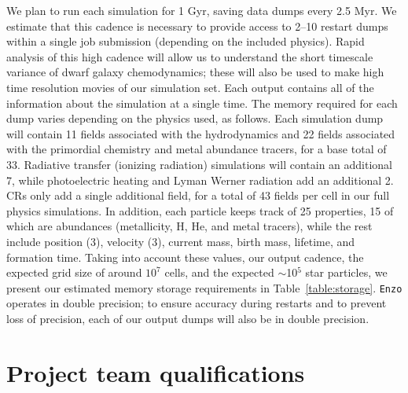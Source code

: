 \documentclass[11pt]{article}
\begin{document}
We plan to run each simulation for 1 Gyr, saving data dumps every 2.5 Myr. We estimate that this cadence is necessary to provide access to 2--10 restart dumps within a single job submission (depending on the included physics). Rapid analysis of this high cadence will allow us to understand the short timescale variance of dwarf galaxy chemodynamics; these will also be used to make high time resolution movies of our simulation set. Each output contains all of the information about the simulation at a single time. The memory required for each dump varies depending on the physics used, as follows. Each simulation dump will contain 11 fields associated with the hydrodynamics and 22 fields associated with the primordial chemistry and metal abundance tracers, for a base total of 33. Radiative transfer (ionizing radiation) simulations will contain an additional 7, while photoelectric heating and Lyman Werner radiation add an additional 2. CRs only add a single additional field, for a total of 43 fields per cell in our full physics simulations. In addition, each particle keeps track of 25 properties, 15 of which are abundances (metallicity, H, He, and metal tracers), while the rest include position (3), velocity (3), current mass, birth mass, lifetime, and formation time. Taking into account these values, our output cadence, the expected grid size of around $10^7$ cells, and the expected $\sim$10$^{5}$ star particles, we present our estimated memory storage requirements in Table~\ref{table:storage}. \texttt{Enzo} operates in double precision; to ensure accuracy during restarts and to prevent loss of precision, each of our output dumps will also be in double precision.

\section{Project team qualifications}
\end{document}
